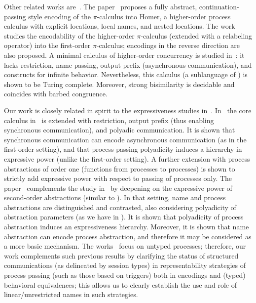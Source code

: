 Other related works are~\cite{BundgaardHG06,XuActa2012,DBLP:journals/iandc/LanesePSS11}.
The paper~\cite{BundgaardHG06} proposes a fully abstract, continuation-passing style encoding of the 
$\pi$-calculus into Homer, a higher-order process calculus with explicit locations, local names, and nested locations.
The work~\cite{XuActa2012} studies the encodability of the higher-order $\pi$-calculus (extended with a relabeling operator) into the first-order $\pi$-calculus; encodings in the reverse direction are also proposed.
A minimal calculus of higher-order concurrency is studied in~\cite{DBLP:journals/iandc/LanesePSS11}: it lacks restriction,  name passing, output prefix (asynchronous communication), and constructs for infinite behavior. 
Nevertheless, this calculus (a sublanguage of \HO) is shown to be Turing complete. Moreover, 
strong bisimilarity is decidable and coincides with barbed congruence. 


Our work is closely related in spirit to the expressiveness studies in~\cite{DBLP:conf/icalp/LanesePSS10,DBLP:conf/wsfm/XuYL13}.
In~\cite{DBLP:conf/icalp/LanesePSS10}
the core calculus in~\cite{DBLP:journals/iandc/LanesePSS11} is extended with restriction, output prefix (thus enabling synchronous communication), 
and polyadic communication. It is shown that 
synchronous communication can encode asynchronous communication (as in the first-order setting),
and that process passing polyadicity induces a hierarchy in expressive power (unlike the first-order setting).
A further extension with process abstractions of order one
(functions from processes to processes)
 is shown to strictly add expressive power with respect to passing of processes only.
The paper~\cite{DBLP:conf/wsfm/XuYL13} complements the study in~\cite{DBLP:conf/icalp/LanesePSS10} by deepening on the expressive power of second-order abstractions (similar to \HO). 
In that setting, name and process abstractions are distinguished and contrasted, also considering polyadicity of abstraction parameters (as we have in \pHOp). It is shown that polyadicity of process abstraction induces an expressiveness hierarchy. Moreover, it is shown that name abstraction can encode process abstraction, and therefore it may be considered as a more basic mechanism. 
The works~\cite{DBLP:conf/icalp/LanesePSS10,DBLP:conf/wsfm/XuYL13} focus on untyped processes;
therefore, our work complements such previous results by clarifying the status of structured communications (as delineated by session types) in representability strategies of process passing (such as those based on triggers) both in encodings and (typed) behavioral equivalences; this allows us to clearly establish the use and role of linear/unrestricted names in such strategies.



